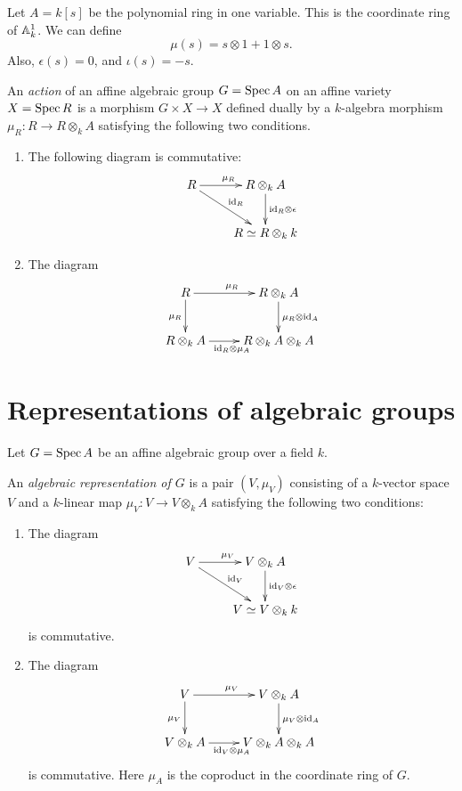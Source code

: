 \documentclass[11pt, norsk]{article}
\begin{document}
\begin{example}
 Let $A=k[s]$ be the polynomial ring in one variable. This is the coordinate ring of $\mathbb{A}_k^1$. We can define 
$$
\mu(s) = s \otimes 1 + 1 \otimes s.
$$
Also, $\epsilon(s)=0$, and $\iota(s)=-s$. 
\end{example}


\begin{defi}
\label{defaction}
An \emph{action} of an affine algebraic group $G = \operatorname{Spec} A$ on an affine variety $X= \operatorname{Spec} R$ is a morphism $G \times X \to X$ defined dually by a $k$-algebra morphism $\mu_R : R \to R \otimes_k A$ satisfying the following two conditions.
\begin{enumerate}
\item  The following diagram is commutative:
\[
\xymatrix{
R \ar[dr]^{\id_R} \ar[r]^{\mu_R} & R \otimes_k A \ar[d]^{\id_R \otimes \epsilon} \\
 & R \simeq R \otimes_k k
}
\]
\item The diagram
\[
\xymatrix{
R \ar[r]^{\mu_R} \ar[d]_{\mu_R} & R \otimes_k A \ar[d]^{\mu_R \otimes \id_A} \\
R \otimes_k A \ar[r]_{\id_R \otimes \mu_A} & R \otimes _k A \otimes_k A
}
\]
\end{enumerate}
\end{defi}


\section{Representations of algebraic groups}

Let $G = \operatorname{Spec} A$ be an affine algebraic group over a field $k$. 

\begin{defi}
 An \emph{algebraic representation of $G$} is a pair $(V,\mu_V)$ consisting of a $k$-vector space $V$ and a $k$-linear map $\mu_V: V \to V \otimes_k A$ satisfying the following two conditions:
 \begin{enumerate}
 \item The diagram
\begin{equation}
\label{eq:algrep1}
\xymatrix{
V \ar[dr]^{\id_V} \ar[r]^{\mu_V} & V \otimes_k A \ar[d]^{\id_V \otimes \epsilon} \\
 & V \simeq V \otimes_k k
}
\end{equation}
is commutative.
\item The diagram
\[
\xymatrix{
V \ar[r]^{\mu_V} \ar[d]_{\mu_V} & V \otimes_k A \ar[d]^{\mu_V \otimes \id_A} \\
V \otimes_k A \ar[r]_{\id_V \otimes \mu_A} & V \otimes _k A \otimes_k A
}
\]
is commutative. Here $\mu_A$ is the coproduct in the coordinate ring of $G$.
 \end{enumerate}
\end{defi}
\end{document}
